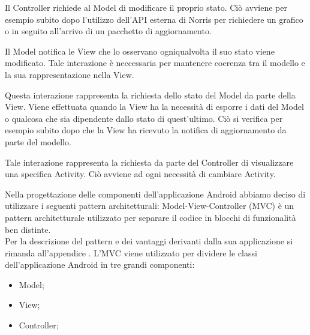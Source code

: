 	    Il Controller richiede al Model di modificare il proprio stato. Ciò avviene per esempio subito dopo l'utilizzo dell'API esterna di Norris per richiedere un grafico o in seguito all'arrivo di un pacchetto di aggiornamento.

	    Il Model notifica le View che lo osservano ogniqualvolta il suo stato viene modificato. Tale interazione è neccessaria per mantenere coerenza tra il modello e la sua rappresentazione nella View. 

	   	Questa interazione rappresenta la richiesta dello stato del Model da parte della View. Viene effettuata quando la View ha la necessità di esporre i dati del Model o qualcosa che sia dipendente dallo stato di quest'ultimo. Ciò si verifica per esempio subito dopo che la View ha ricevuto la notifica di aggiornamento da parte del modello.

	   	Tale interazione rappresenta la richiesta da parte del Controller di visualizzare una specifica Activity. Ciò avviene ad ogni necessità di cambiare Activity.
        
    Nella progettazione delle componenti dell'applicazione Android abbiamo deciso di utilizzare i seguenti pattern architetturali:
        Model-View-Controller (MVC) è un pattern architetturale utilizzato per separare il codice in blocchi di funzionalità ben distinte.\\
        Per la descrizione del pattern e dei vantaggi derivanti dalla sua applicazione si rimanda all'appendice .
        L'MVC viene utilizzato per dividere le classi dell'applicazione Android in tre grandi componenti:
        \begin{itemize}
        \item Model;
        \item View;
        \item Controller;
        \end{itemize}

